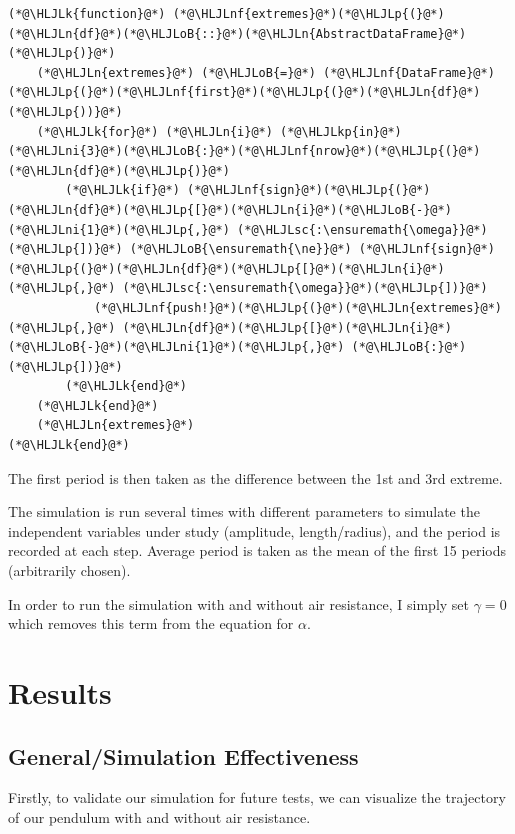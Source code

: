 \documentclass[12pt,a4paper]{article}
\newcommand{\HLJLk}[1]{\textcolor[RGB]{148,91,176}{\textbf{#1}}}
\newcommand{\HLJLkp}[1]{\textcolor[RGB]{148,91,176}{\textbf{#1}}}
\newcommand{\HLJLn}[1]{#1}
\newcommand{\HLJLnf}[1]{\textcolor[RGB]{66,102,213}{#1}}
\newcommand{\HLJLsc}[1]{\textcolor[RGB]{201,61,57}{#1}}
\newcommand{\HLJLni}[1]{\textcolor[RGB]{59,151,46}{#1}}
\newcommand{\HLJLoB}[1]{\textcolor[RGB]{102,102,102}{\textbf{#1}}}
\newcommand{\HLJLp}[1]{#1}
\begin{document}
\begin{lstlisting}
(*@\HLJLk{function}@*) (*@\HLJLnf{extremes}@*)(*@\HLJLp{(}@*)(*@\HLJLn{df}@*)(*@\HLJLoB{::}@*)(*@\HLJLn{AbstractDataFrame}@*)(*@\HLJLp{)}@*)
    (*@\HLJLn{extremes}@*) (*@\HLJLoB{=}@*) (*@\HLJLnf{DataFrame}@*)(*@\HLJLp{(}@*)(*@\HLJLnf{first}@*)(*@\HLJLp{(}@*)(*@\HLJLn{df}@*)(*@\HLJLp{))}@*)
    (*@\HLJLk{for}@*) (*@\HLJLn{i}@*) (*@\HLJLkp{in}@*) (*@\HLJLni{3}@*)(*@\HLJLoB{:}@*)(*@\HLJLnf{nrow}@*)(*@\HLJLp{(}@*)(*@\HLJLn{df}@*)(*@\HLJLp{)}@*)
        (*@\HLJLk{if}@*) (*@\HLJLnf{sign}@*)(*@\HLJLp{(}@*)(*@\HLJLn{df}@*)(*@\HLJLp{[}@*)(*@\HLJLn{i}@*)(*@\HLJLoB{-}@*)(*@\HLJLni{1}@*)(*@\HLJLp{,}@*) (*@\HLJLsc{:\ensuremath{\omega}}@*)(*@\HLJLp{])}@*) (*@\HLJLoB{\ensuremath{\ne}}@*) (*@\HLJLnf{sign}@*)(*@\HLJLp{(}@*)(*@\HLJLn{df}@*)(*@\HLJLp{[}@*)(*@\HLJLn{i}@*)(*@\HLJLp{,}@*) (*@\HLJLsc{:\ensuremath{\omega}}@*)(*@\HLJLp{])}@*)
            (*@\HLJLnf{push!}@*)(*@\HLJLp{(}@*)(*@\HLJLn{extremes}@*)(*@\HLJLp{,}@*) (*@\HLJLn{df}@*)(*@\HLJLp{[}@*)(*@\HLJLn{i}@*)(*@\HLJLoB{-}@*)(*@\HLJLni{1}@*)(*@\HLJLp{,}@*) (*@\HLJLoB{:}@*)(*@\HLJLp{])}@*)
        (*@\HLJLk{end}@*)
    (*@\HLJLk{end}@*)
    (*@\HLJLn{extremes}@*)
(*@\HLJLk{end}@*)
\end{lstlisting}

The first period is then taken as the difference between the 1st and 3rd extreme.

The simulation is run several times with different parameters to simulate the independent variables under study (amplitude, length/radius), and the period is recorded at each step. Average period is taken as the mean of the first 15 periods (arbitrarily chosen).

In order to run the simulation with and without air resistance, I simply set $\gamma = 0$ which removes this term from the equation for $\alpha$.

\section{Results}
\subsection{General/Simulation Effectiveness}
Firstly, to validate our simulation for future tests, we can visualize the trajectory of our pendulum with and without air resistance.
\end{document}

